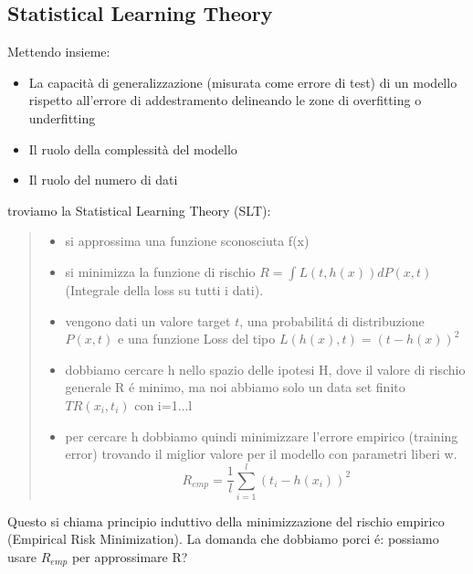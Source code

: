 \documentclass{article}
\begin{document}
\subsection{Statistical Learning Theory}
Mettendo insieme: 
\begin{itemize}
    \item La capacità di generalizzazione (misurata come errore di test) di un modello rispetto all'errore di addestramento delineando le zone di overfitting o underfitting
    \item Il ruolo della complessità del modello
    \item Il ruolo del numero di dati
\end{itemize}
troviamo la Statistical Learning Theory (SLT):
\begin{quote}
    \begin{itemize}
        \item si approssima una funzione sconosciuta f(x)
        \item si minimizza la funzione di rischio $R=\int L(t,h(x))dP(x,t)$ (Integrale della loss su tutti i dati).
        \item vengono dati un valore target $t$, una probabilitá di distribuzione $P(x,t)$ e una funzione Loss del tipo $L(h(x),t)=(t-h(x))^2$
        \item dobbiamo cercare h nello spazio delle ipotesi H, dove il valore di rischio generale R é minimo, ma noi abbiamo solo un data set finito $TR(x_i,t_i)$ con i=1...l
        \item per cercare h dobbiamo quindi minimizzare l'errore empirico (training error) trovando il miglior valore per il modello con parametri liberi w. \[R_{emp}=\frac{1}{l}\sum_{i = 1}^l (t_i-h(x_i))^2\]
    \end{itemize}
\end{quote}
Questo si chiama principio induttivo della minimizzazione del rischio empirico (Empirical Risk Minimization). La domanda che dobbiamo porci é: possiamo usare $R_{emp}$ per approssimare R?
\end{document}
